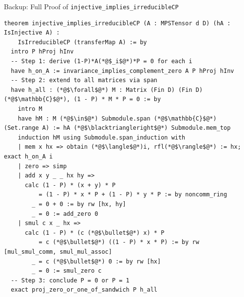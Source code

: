 \documentclass[aspectratio=169,10pt]{beamer}
\begin{document}
\begin{frame}[fragile]{Backup: Full Proof of \texttt{injective\_implies\_irreducibleCP}}
\vspace{-0.7em}
\begin{lstlisting}[basicstyle=\ttfamily\fontsize{4.5}{5.5}\selectfont\color{white}]
theorem injective_implies_irreducibleCP (A : MPSTensor d D) (hA : IsInjective A) :
    IsIrreducibleCP (transferMap A) := by
  intro P hProj hInv
  -- Step 1: derive (1-P)*A(*@$_i$@*)*P = 0 for each i
  have h_on_A := invariance_implies_complement_zero A P hProj hInv
  -- Step 2: extend to all matrices via span
  have h_all : (*@$\forall$@*) M : Matrix (Fin D) (Fin D) (*@$\mathbb{C}$@*), (1 - P) * M * P = 0 := by
    intro M
    have hM : M (*@$\in$@*) Submodule.span (*@$\mathbb{C}$@*) (Set.range A) := hA (*@$\blacktriangleright$@*) Submodule.mem_top
    induction hM using Submodule.span_induction with
    | mem x hx => obtain (*@$\langle$@*)i, rfl(*@$\rangle$@*) := hx; exact h_on_A i
    | zero => simp
    | add x y _ _ hx hy =>
      calc (1 - P) * (x + y) * P
          = (1 - P) * x * P + (1 - P) * y * P := by noncomm_ring
        _ = 0 + 0 := by rw [hx, hy]
        _ = 0 := add_zero 0
    | smul c x _ hx =>
      calc (1 - P) * (c (*@$\bullet$@*) x) * P
          = c (*@$\bullet$@*) ((1 - P) * x * P) := by rw [mul_smul_comm, smul_mul_assoc]
        _ = c (*@$\bullet$@*) 0 := by rw [hx]
        _ = 0 := smul_zero c
  -- Step 3: conclude P = 0 or P = 1
  exact proj_zero_or_one_of_sandwich P h_all
\end{lstlisting}
\end{frame}
\end{document}

